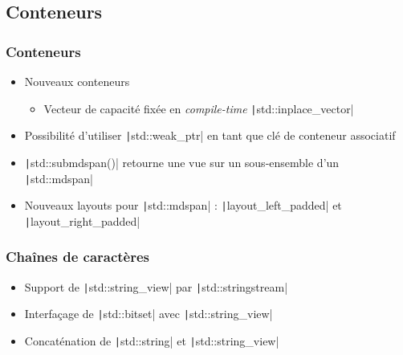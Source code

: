 \documentclass[C++.tex]{subfiles}
\begin{document}
\subsection*{Conteneurs}
\begin{frame}[fragile]
	\frametitle{Conteneurs}
	\begin{itemize}
		\item Nouveaux conteneurs
		\begin{itemize}
			\item Vecteur de capacité fixée en \textit{compile-time} \texttt|std::inplace_vector|

		\end{itemize}
		\item Possibilité d'utiliser \texttt|std::weak_ptr| en tant que clé de conteneur associatif
		\item \texttt|std::submdspan()| retourne une vue sur un sous-ensemble d'un \texttt|std::mdspan|
		\item Nouveaux layouts pour \texttt|std::mdspan| : \texttt|layout_left_padded| et \texttt|layout_right_padded|
	\end{itemize}

\end{frame}

\begin{frame}[fragile]
	\frametitle{Chaînes de caractères}
	\begin{itemize}
		\item Support de \texttt|std::string_view| par \texttt|std::stringstream|
		\item Interfaçage de \texttt|std::bitset| avec \texttt|std::string_view|
		\item Concaténation de \texttt|std::string| et \texttt|std::string_view|
	\end{itemize}

\end{frame}
\end{document}
